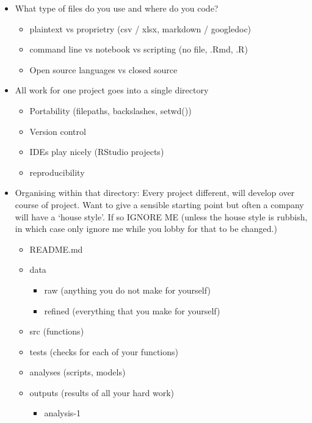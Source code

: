 \documentclass[
  12pt,
]{book}
\providecommand{\tightlist}{%
  \setlength{\itemsep}{0pt}\setlength{\parskip}{0pt}}
\theoremstyle{definition}
\theoremstyle{definition}
\theoremstyle{definition}
\theoremstyle{definition}
\theoremstyle{remark}
\begin{document}
\begin{itemize}
\tightlist
\item
  What type of files do you use and where do you code?

  \begin{itemize}
  \tightlist
  \item
    plaintext vs proprietry (csv / xlsx, markdown / googledoc)
  \item
    command line vs notebook vs scripting (no file, .Rmd, .R)
  \item
    Open source languages vs closed source
  \end{itemize}
\item
  All work for one project goes into a single directory

  \begin{itemize}
  \tightlist
  \item
    Portability (filepaths, backslashes, setwd())
  \item
    Version control
  \item
    IDEs play nicely (RStudio projects)
  \item
    reproducibility
  \end{itemize}
\item
  Organising within that directory: Every project different, will develop over course of project. Want to give a sensible starting point but often a company will have a `house style'. If so IGNORE ME (unless the house style is rubbish, in which case only ignore me while you lobby for that to be changed.)

  \begin{itemize}
  \tightlist
  \item
    README.md
  \item
    data

    \begin{itemize}
    \tightlist
    \item
      raw (anything you do not make for yourself)
    \item
      refined (everything that you make for yourself)
    \end{itemize}
  \item
    src (functions)
  \item
    tests (checks for each of your functions)
  \item
    analyses (scripts, models)
  \item
    outputs (results of all your hard work)

    \begin{itemize}
    \tightlist
    \item
      analysis-1


\end{itemize}
\end{itemize}
\end{itemize}
\end{document}
